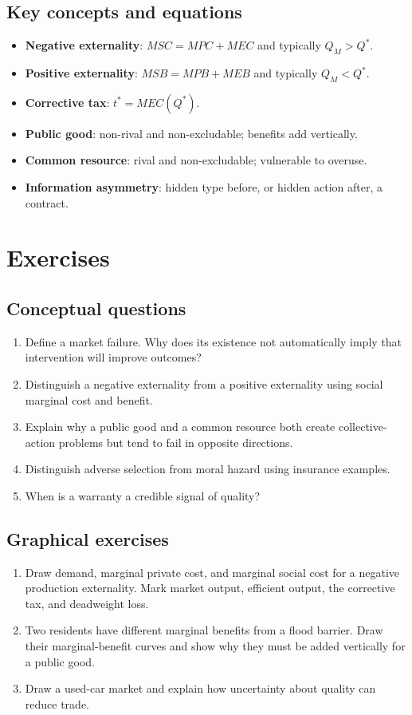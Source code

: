 \subsection*{Key concepts and equations}
\begin{itemize}
  \item \textbf{Negative externality}: $MSC=MPC+MEC$ and typically $Q_M>Q^*$.
  \item \textbf{Positive externality}: $MSB=MPB+MEB$ and typically $Q_M<Q^*$.
  \item \textbf{Corrective tax}: $t^*=MEC(Q^*)$.
  \item \textbf{Public good}: non-rival and non-excludable; benefits add vertically.
  \item \textbf{Common resource}: rival and non-excludable; vulnerable to overuse.
  \item \textbf{Information asymmetry}: hidden type before, or hidden action after, a contract.
\end{itemize}

\section*{Exercises}

\subsection*{Conceptual questions}
\begin{enumerate}[label=\arabic*.]
  \item Define a market failure. Why does its existence not automatically imply that intervention will improve outcomes?
  \item Distinguish a negative externality from a positive externality using social marginal cost and benefit.
  \item Explain why a public good and a common resource both create collective-action problems but tend to fail in opposite directions.
  \item Distinguish adverse selection from moral hazard using insurance examples.
  \item When is a warranty a credible signal of quality?
\end{enumerate}

\subsection*{Graphical exercises}
\begin{enumerate}[resume,label=\arabic*.]
  \item Draw demand, marginal private cost, and marginal social cost for a negative production externality. Mark market output, efficient output, the corrective tax, and deadweight loss.
  \item Two residents have different marginal benefits from a flood barrier. Draw their marginal-benefit curves and show why they must be added vertically for a public good.
  \item Draw a used-car market and explain how uncertainty about quality can reduce trade.
\end{enumerate}

